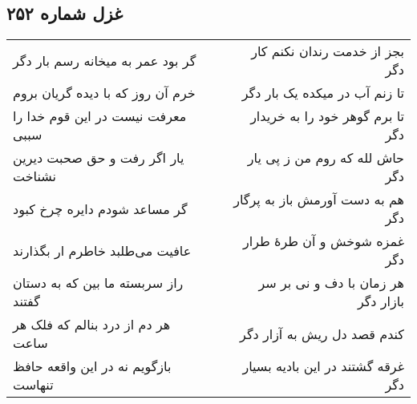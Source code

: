 \begin{center}
\section*{غزل شماره ۲۵۲}
\label{sec:sh252}
\begin{longtable}{l p{0.5cm} r}
گر بود عمر به میخانه رسم بار دگر
&&
بجز از خدمت رندان نکنم کار دگر
\\
خرم آن روز که با دیده گریان بروم
&&
تا زنم آب در میکده یک بار دگر
\\
معرفت نیست در این قوم خدا را سببی
&&
تا برم گوهر خود را به خریدار دگر
\\
یار اگر رفت و حق صحبت دیرین نشناخت
&&
حاش لله که روم من ز پی یار دگر
\\
گر مساعد شودم دایره چرخ کبود
&&
هم به دست آورمش باز به پرگار دگر
\\
عافیت می‌طلبد خاطرم ار بگذارند
&&
غمزه شوخش و آن طرهٔ طرار دگر
\\
راز سربسته ما بین که به دستان گفتند
&&
هر زمان با دف و نی بر سر بازار دگر
\\
هر دم از درد بنالم که فلک هر ساعت
&&
کندم قصد دل ریش به آزار دگر
\\
بازگویم نه در این واقعه حافظ تنهاست
&&
غرقه گشتند در این بادیه بسیار دگر
\\
\end{longtable}
\end{center}
